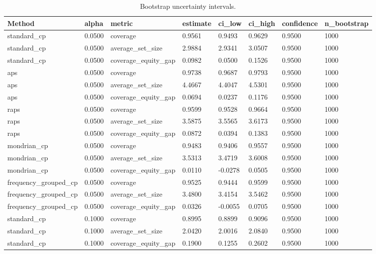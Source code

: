 \begin{table}[htbp]
\centering
\caption{Bootstrap uncertainty intervals.}
\label{tab:bootstrap\_intervals}
\begin{tabular}{llllllll}
\hline
Method & alpha & metric & estimate & ci\_low & ci\_high & confidence & n\_bootstrap \\
\hline
standard\_cp & 0.0500 & coverage & 0.9561 & 0.9493 & 0.9629 & 0.9500 & 1000 \\
standard\_cp & 0.0500 & average\_set\_size & 2.9884 & 2.9341 & 3.0507 & 0.9500 & 1000 \\
standard\_cp & 0.0500 & coverage\_equity\_gap & 0.0982 & 0.0500 & 0.1526 & 0.9500 & 1000 \\
aps & 0.0500 & coverage & 0.9738 & 0.9687 & 0.9793 & 0.9500 & 1000 \\
aps & 0.0500 & average\_set\_size & 4.4667 & 4.4047 & 4.5301 & 0.9500 & 1000 \\
aps & 0.0500 & coverage\_equity\_gap & 0.0694 & 0.0237 & 0.1176 & 0.9500 & 1000 \\
raps & 0.0500 & coverage & 0.9599 & 0.9528 & 0.9664 & 0.9500 & 1000 \\
raps & 0.0500 & average\_set\_size & 3.5875 & 3.5565 & 3.6173 & 0.9500 & 1000 \\
raps & 0.0500 & coverage\_equity\_gap & 0.0872 & 0.0394 & 0.1383 & 0.9500 & 1000 \\
mondrian\_cp & 0.0500 & coverage & 0.9483 & 0.9406 & 0.9557 & 0.9500 & 1000 \\
mondrian\_cp & 0.0500 & average\_set\_size & 3.5313 & 3.4719 & 3.6008 & 0.9500 & 1000 \\
mondrian\_cp & 0.0500 & coverage\_equity\_gap & 0.0110 & -0.0278 & 0.0505 & 0.9500 & 1000 \\
frequency\_grouped\_cp & 0.0500 & coverage & 0.9525 & 0.9444 & 0.9599 & 0.9500 & 1000 \\
frequency\_grouped\_cp & 0.0500 & average\_set\_size & 3.4800 & 3.4154 & 3.5462 & 0.9500 & 1000 \\
frequency\_grouped\_cp & 0.0500 & coverage\_equity\_gap & 0.0326 & -0.0055 & 0.0705 & 0.9500 & 1000 \\
standard\_cp & 0.1000 & coverage & 0.8995 & 0.8899 & 0.9096 & 0.9500 & 1000 \\
standard\_cp & 0.1000 & average\_set\_size & 2.0420 & 2.0016 & 2.0840 & 0.9500 & 1000 \\
standard\_cp & 0.1000 & coverage\_equity\_gap & 0.1900 & 0.1255 & 0.2602 & 0.9500 & 1000 \\

\end{tabular}
\end{table}
